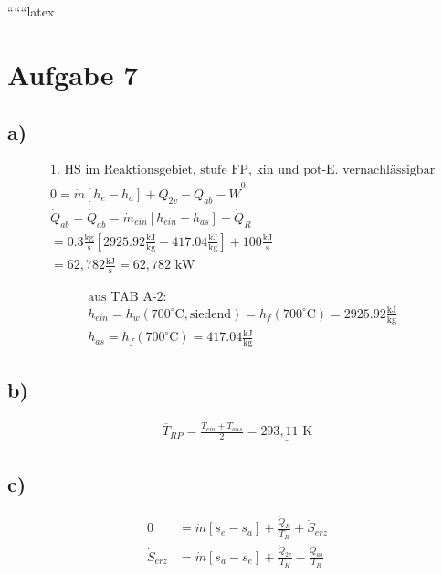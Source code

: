 
``````latex


\section*{Aufgabe 7}

\subsection*{a)}
\begin{align*}
&\text{1. HS im Reaktionsgebiet, stufe FP, kin und pot-E. vernachlässigbar} \\
&0 = \dot{m} \left[ h_e - h_a \right] + \dot{Q}_{2v} - \dot{Q}_{ab} - \dot{W}^0 \\
&\dot{Q}_{ab} = \dot{Q}_{ab} = \dot{m}_{ein} \left[ h_{ein} - h_{as} \right] + \dot{Q}_R \\
&= 0.3 \frac{\text{kg}}{\text{s}} \left[ 2925.92 \frac{\text{kJ}}{\text{kg}} - 417.04 \frac{\text{kJ}}{\text{kg}} \right] + 100 \frac{\text{kJ}}{\text{s}} \\
&= 62,782 \frac{\text{kJ}}{\text{s}} = 62,782 \text{ kW}
\end{align*}

\begin{align*}
&\text{aus TAB A-2:} \\
&h_{ein} = h_w (700^\circ \text{C}, \text{siedend}) = h_f (700^\circ \text{C}) = 2925.92 \frac{\text{kJ}}{\text{kg}} \\
&h_{as} = h_f (700^\circ \text{C}) = 417.04 \frac{\text{kJ}}{\text{kg}}
\end{align*}

\subsection*{b)}
\begin{align*}
\overline{T}_{RP} = \frac{T_{ein} + T_{aus}}{2} = \underline{293,11 \text{ K}}
\end{align*}

\subsection*{c)}
\begin{align*}
0 &= \dot{m} \left[ s_e - s_a \right] + \frac{\dot{Q}_R}{T_R} + \dot{S}_{erz} \\
\dot{S}_{erz} &= \dot{m} \left[ s_a - s_e \right] + \frac{\dot{Q}_{2v}}{T_K} - \frac{\dot{Q}_{ab}}{T_R}
\end{align*}

